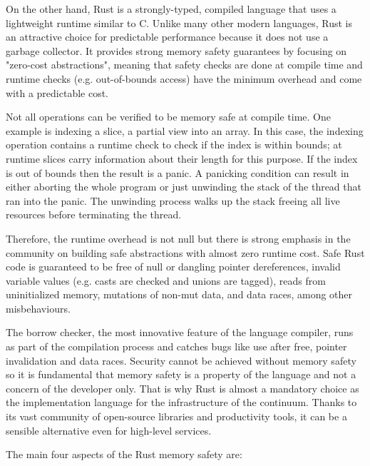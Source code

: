 On the other hand, Rust is a strongly-typed, compiled language that uses a lightweight runtime similar to C. Unlike many other modern languages, Rust is an attractive choice for predictable performance because it does not use a garbage collector. It provides strong memory safety guarantees by focusing on "zero-cost abstractions", meaning that safety checks are done at compile time and runtime checks (e.g. out-of-bounds access) have the minimum overhead and come with a predictable cost.

Not all operations can be verified to be memory safe at compile time. One example is indexing a slice, a partial view into an array. In this case, the indexing operation contains a runtime check to check if the index is within bounds; at runtime slices carry information about their length for this purpose. If the index is out of bounds then the result is a panic. A panicking condition can result in either aborting the whole program or just unwinding the stack of the thread that ran into the panic. The unwinding process walks up the stack freeing all live resources before terminating the thread.

Therefore, the runtime overhead is not null but there is strong emphasis in the community on building safe abstractions with almost zero runtime cost. Safe Rust code is guaranteed to be free of null or dangling pointer dereferences, invalid variable values (e.g. casts are checked and unions are tagged), reads from uninitialized memory, mutations of non-mut data, and data races, among other misbehaviours. 

The borrow checker, the most innovative feature of the language compiler, runs as part of the compilation process and catches bugs like use after free, pointer invalidation and data races. Security cannot be achieved without memory safety so it is fundamental that memory safety is a property of the language and not a concern of the developer only. That is why Rust is almost a mandatory choice as the implementation language for the infrastructure of the continuum. Thanks to its vast community of open-source libraries and productivity tools, it can be a sensible alternative even for high-level services.

The main four aspects of the Rust memory safety are:

